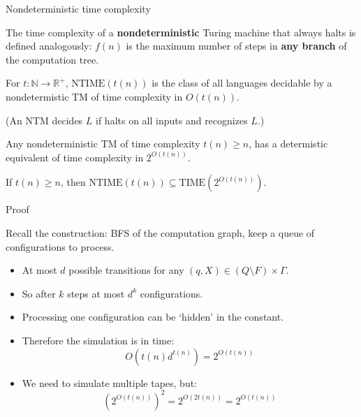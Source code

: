 \documentclass[handout]{beamer}
\begin{document}
\begin{frame}{Nondeterministic time complexity}
    
    The \alert{time complexity} of a \textbf{nondeterministic} Turing machine that always halts is defined analogously: $f(n)$ is the maximum number of steps in \textbf{any branch} of the computation tree.
    
    \begin{definition}
        For $t:\mathbb{N}\to \mathbb{R}^+$, \alert{$\mathrm{NTIME}(t(n))$} is the class of all languages decidable by a nondetermistic TM of time complexity in $O(t(n))$.
    \end{definition}
    \vspace{-6pt}
    (An NTM \alert{decides} $L$ if halts on all inputs and recognizes $L$.)

    \smallskip

    \begin{theorem}        
    Any nondeterministic TM of time complexity $t(n)\geq n$, has a determistic equivalent of time complexity in $2^{O(t(n))}$.
    \end{theorem}

    \begin{corollary}
        If $t(n)\geq n$, then $\mathrm{NTIME}(t(n))\subseteq \mathrm{TIME}(2^{O(t(n))})$.
    \end{corollary}
    
\end{frame}


\begin{frame}{Proof}

    Recall the construction: BFS of the computation graph, keep a queue of configurations to process.
    \begin{itemize}
        \item At most $d$ possible transitions for any $(q,X)\in (Q\setminus F)\times \Gamma$. 
        \item So after $k$ steps at most $d^k$ configurations.
        \item Processing one configuration can be `hidden' in the constant.
        \item Therefore the simulation is in time:
        $$
        O(t(n)d^{t(n)})=2^{O(t(n))}
        $$
        \item We need to simulate multiple tapes, but: 
        $$
        (2^{O(t(n))})^2=2^{O(2t(n))}=2^{O(t(n))}
        $$

        \vspace{-12pt}
        \hfill\qedsymbol
    \end{itemize}

\end{frame}
\end{document}
